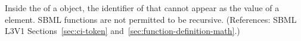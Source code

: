 Inside the  of a \FunctionDefinition object, the identifier
of that \FunctionDefinition cannot appear as the value of a 
element.  SBML functions are not permitted to be recursive.  (References:
SBML L3V1 Sections~\ref{sec:ci-token}
and~\ref{sec:function-definition-math}.)

